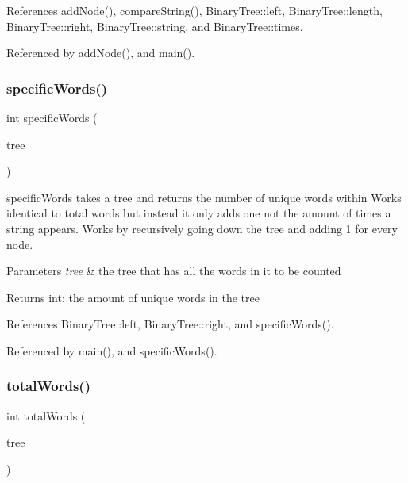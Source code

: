 References add\+Node(), compare\+String(), Binary\+Tree\+::left, Binary\+Tree\+::length, Binary\+Tree\+::right, Binary\+Tree\+::string, and Binary\+Tree\+::times.



Referenced by add\+Node(), and main().

\mbox{\label{tree_8c_a2baa7dc033b7a2823abeaf84f66d59ee}} 
\subsubsection{specific\+Words()}
{\footnotesize\ttfamily int specific\+Words (\begin{DoxyParamCaption}\item[{\textbf{ Binary\+Tree} $\ast$}]{tree }\end{DoxyParamCaption})}

specific\+Words takes a tree and returns the number of unique words within Works identical to total words but instead it only adds one not the amount of times a string appears. Works by recursively going down the tree and adding 1 for every node. 
\begin{DoxyParams}{Parameters}
{\em tree} & the tree that has all the words in it to be counted \\
\hline
\end{DoxyParams}
\begin{DoxyReturn}{Returns}
int\+: the amount of unique words in the tree 
\end{DoxyReturn}


References Binary\+Tree\+::left, Binary\+Tree\+::right, and specific\+Words().



Referenced by main(), and specific\+Words().

\mbox{\label{tree_8c_a48852a94b6a678216da42240b703f4ef}} 
\subsubsection{total\+Words()}
{\footnotesize\ttfamily int total\+Words (\begin{DoxyParamCaption}\item[{\textbf{ Binary\+Tree} $\ast$}]{tree }\end{DoxyParamCaption})}

